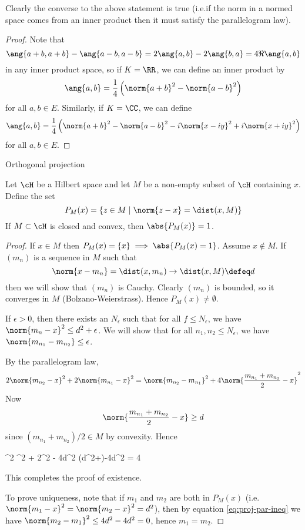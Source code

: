 \begin{rmk}
	Clearly the converse to the above statement is true (i.e.\@ if the norm in a normed space comes from an inner product then it must satisfy the parallelogram law).
\end{rmk}

\begin{proof}
	Note that
	\[\ang{a+b,a+b}-\ang{a-b,a-b} = 2\ang{a,b}-2\ang{b,a} = 4\Re\ang{a,b}\]
	in any inner product space, so if $K=\RR$, we can define an inner product by
	\[\ang{a,b} = \frac 14 \left(\norm{a+b}^2 - \norm{a-b}^2\right)\]
	for all $a,b \in E$.
	Similarly, if $K=\CC$, we can define
	\[\ang{a,b} = \frac 14 \left(\norm{a+b}^2 - \norm{a-b}^2 - i\norm{x-iy}^2 + i\norm{x+iy}^2\right)\]
	for all $a,b \in E$.
\end{proof}

Orthogonal projection

\begin{thm}
	Let $\cH$ be a Hilbert space and let $M$ be a non-empty subset of $\cH$ containing $x$.
	Define the set
	\[P_M(x) = \left\{ z \in M \mid \norm{z-x} = \dist(x,M) \right\}\]
	If $M \subset \cH$ is closed and convex, then $\abs{P_M(x)}=1$.
\end{thm}

\begin{proof}
	If $x \in M$ then $P_M(x) = \{x\} \implies \abs{P_M(x)=1}$.
	Assume $x \notin M$.
	If $(m_n)$ is a sequence in $M$ such that
	\[\norm{x-m_n} = \dist(x,m_n) \to \dist(x,M) \defeq d\]
	then we will show that $(m_n)$ is Cauchy.
	Clearly $(m_n)$ is bounded, so it converges in $M$ (Bolzano-Weierstrass).
	Hence $P_M(x) \neq \emptyset$.
	
	If $\epsilon>0$, then there exists an $N_\epsilon$ such that for all $f \leq N_\epsilon$, we have $\norm{m_n-x}^2 \leq d^2+\epsilon$.
	We will show that for all $n_1,n_2 \leq N_\epsilon$, we have $\norm{m_{n_1}-m_{n_2}} \leq \epsilon$.
	
	By the parallelogram law,
	\[2\norm{m_{n_2}-x}^2 + 2\norm{m_{n_1}-x}^2 = \norm{m_{n_2}-m_{n_1}}^2 + 4\norm{\frac{m_{n_1}+m_{n_2}}{2}-x}^2\]
	Now
	\[\norm{\frac{m_{n_1}+m_{n_2}}{2}-x} \geq d\]
	since $(m_{n_1}+m_{n_2})/2 \in M$ by convexity.
	Hence
	\begin{eqn}\label{eq:proj-par-ineq}
		^2 ^2 + 2^2 - 4d^2 (d^2+\epsilon)-4d^2 = 4\epsilon
	\end{eqn}
	This completes the proof of existence.
	
	To prove uniqueness, note that if $m_1$ and $m_2$ are both in $P_M(x)$ (i.e.\@ $\norm{m_1-x}^2=\norm{m_2-x}^2=d^2$), then by equation \ref{eq:proj-par-ineq} we have $\norm{m_2-m_1}^2 \leq 4d^2-4d^2=0$, hence $m_1=m_2$.
\end{proof}

